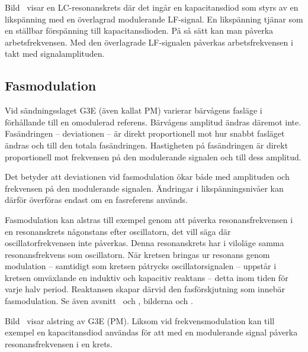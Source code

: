 
Bild~ visar en LC-resonanskrets där det ingår en
kapacitansdiod som styrs av en likspänning med en överlagrad modulerande LF-signal.
En likspänning tjänar som en ställbar förspänning till kapacitansdioden.
På så sätt kan man påverka arbetsfrekvensen.
Med den överlagrade LF-signalen påverkas arbetsfrekvensen i takt med
signalamplituden.

\subsection{Fasmodulation}

Vid sändningsslaget G3E (även kallat PM) varierar bärvågens fasläge i
förhållande till en omodulerad referens.
Bärvågens amplitud ändras däremot inte.
Fasändringen -- deviationen -- är direkt proportionell mot hur snabbt fasläget
ändras och till den totala fasändringen.
Hastigheten på fasändringen är direkt proportionell mot frekvensen på den
modulerande signalen och till dess amplitud.

Det betyder att deviationen vid fasmodulation ökar både med amplituden
och frekvensen på den modulerande signalen.
Ändringar i likspänningsnivåer kan därför överföras endast om en fasreferens
används.

Fasmodulation kan alstras till exempel genom att påverka resonansfrekvensen i
en resonanskrets någonstans efter oscillatorn, det vill säga där
oscillatorfrekvensen inte påverkas.
Denna resonanskrets har i viloläge samma resonansfrekvens som oscillatorn.
När kretsen bringas ur resonans genom modulation -- samtidigt som kretsen
påtrycks oscillatorsignalen -- uppstår i kretsen omväxlande en induktiv och
kapacitiv reaktans -- detta inom tiden för varje halv period.
Reaktansen skapar därvid den fasförskjutning som innebär fasmodulation.
Se även avsnitt~ och , bilderna
 och .


Bild~ visar alstring av G3E (PM).
Liksom vid frekvensmodulation kan till exempel en kapacitansdiod användas för
att med en modulerande signal påverka resonansfrekvensen i en krets.
